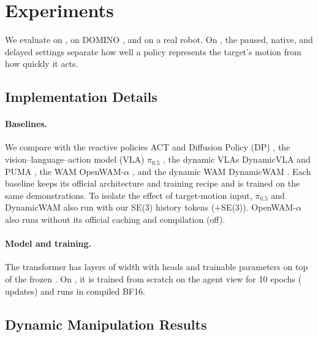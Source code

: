 \section{Experiments}
\label{sec:experiments}

We evaluate \ours on \bench, on DOMINO \cite{domino}, and on a real robot. On \bench,
the paused, native, and delayed settings separate how well a policy represents the
target's motion from how quickly it acts.

\subsection{Implementation Details}
\label{sec:setup}

\paragraph{Baselines.}
We compare with the reactive policies ACT \cite{act} and Diffusion Policy (DP)
\cite{diffusionpolicy}, the vision--language--action model (VLA) $\pi_{0.5}$ \cite{pi05}, the dynamic VLAs DynamicVLA
\cite{dynamicvla} and PUMA \cite{domino}, the WAM OpenWAM-$\alpha$ \cite{openwam_alpha},
and the dynamic WAM DynamicWAM \cite{dynamicwam}. Each baseline keeps its official
architecture and training recipe and is trained on the same demonstrations. To isolate
the effect of target-motion input, $\pi_{0.5}$ and DynamicWAM also run with our SE(3)
history tokens (+SE(3)). OpenWAM-$\alpha$ also runs without its official caching and
compilation (off).

\paragraph{Model and training.}
The \ours transformer has \cfgLayers{} layers of width \cfgWidth{} with \cfgHeads{}
heads and \cfgTrainableParams{} trainable parameters on top of the frozen
\cfgVisualEncoder{}. On \bench, it is trained from scratch on the agent view for 10 epochs (\cfgUpdates{} updates) and runs in compiled BF16.





\subsection{Dynamic Manipulation Results}
\label{sec:main_results}

